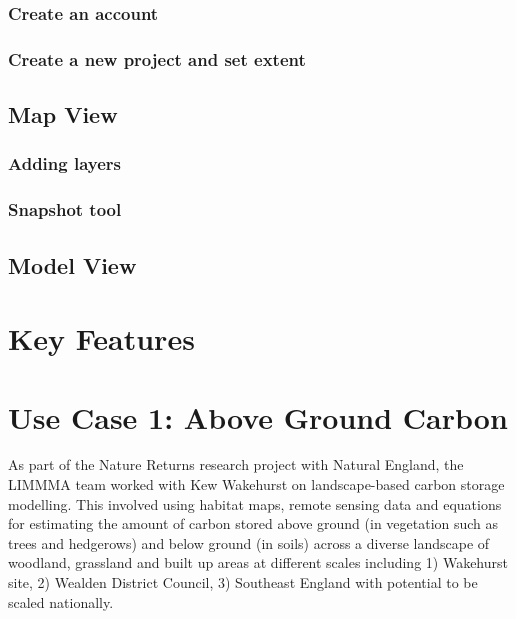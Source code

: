 \documentclass[
  letterpaper,
  DIV=11,
  numbers=noendperiod]{scrreprt}
\begin{document}
\subsection{Create an account}\label{create-an-account}

\subsection{Create a new project and set
extent}\label{create-a-new-project-and-set-extent}

\section{Map View}\label{map-view}

\subsection{Adding layers}\label{adding-layers}

\subsection{Snapshot tool}\label{snapshot-tool}

\section{Model View}\label{model-view}


\chapter{Key Features}\label{key-features}


\chapter{Use Case 1: Above Ground
Carbon}\label{use-case-1-above-ground-carbon}

As part of the Nature Returns research project with Natural England, the
LIMMMA team worked with Kew Wakehurst on landscape-based carbon storage
modelling. This involved using habitat maps, remote sensing data and
equations for estimating the amount of carbon stored above ground (in
vegetation such as trees and hedgerows) and below ground (in soils)
across a diverse landscape of woodland, grassland and built up areas at
different scales including 1) Wakehurst site, 2) Wealden District
Council, 3) Southeast England with potential to be scaled nationally.
\end{document}

